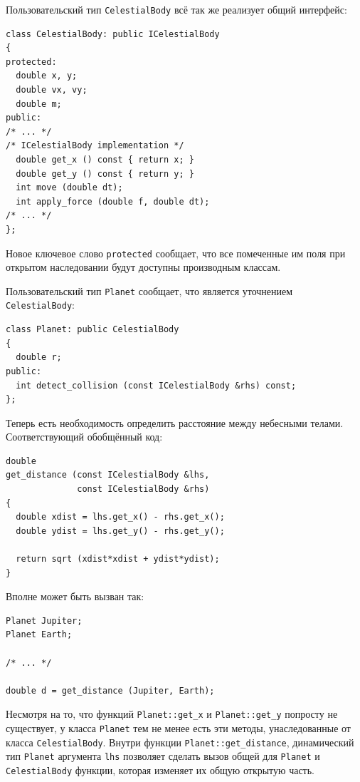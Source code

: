 \documentclass[a4paper,12pt,oneside]{article}
\begin{document}
Пользовательский тип \lstinline!CelestialBody! всё так же реализует общий интерфейс:

\begin{lstlisting}
class CelestialBody: public ICelestialBody
{
protected:
  double x, y;
  double vx, vy;
  double m;
public:
/* ... */
/* ICelestialBody implementation */
  double get_x () const { return x; }
  double get_y () const { return y; }
  int move (double dt); 
  int apply_force (double f, double dt);
/* ... */
};
\end{lstlisting}

Новое ключевое слово \lstinline!protected! сообщает, что все помеченные им поля при открытом наследовании будут доступны производным классам.

Пользовательский тип \lstinline!Planet! сообщает, что является уточнением \lstinline!CelestialBody!:

\begin{lstlisting}
class Planet: public CelestialBody
{
  double r;
public:
  int detect_collision (const ICelestialBody &rhs) const;
};
\end{lstlisting}

Теперь есть необходимость определить расстояние между небесными телами. Соответствующий обобщённый код:

\begin{lstlisting}
double 
get_distance (const ICelestialBody &lhs, 
              const ICelestialBody &rhs)
{
  double xdist = lhs.get_x() - rhs.get_x();
  double ydist = lhs.get_y() - rhs.get_y();

  return sqrt (xdist*xdist + ydist*ydist);
}
\end{lstlisting}

Вполне может быть вызван так:

\begin{lstlisting}
Planet Jupiter;
Planet Earth;

/* ... */

double d = get_distance (Jupiter, Earth);
\end{lstlisting}

Несмотря на то, что функций \lstinline!Planet::get_x! и \lstinline!Planet::get_y! попросту не существует, у класса \lstinline!Planet! тем не менее есть эти методы, унаследованные от класса \lstinline!CelestialBody!. Внутри функции \lstinline!Planet::get_distance!, динамический тип \lstinline!Planet! аргумента \lstinline!lhs! позволяет сделать вызов общей для \lstinline!Planet! и \lstinline!CelestialBody! функции, которая изменяет их общую открытую часть.
\end{document}
